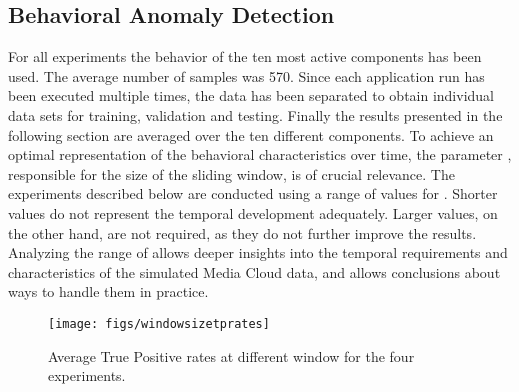 \documentclass{llncs}
\begin{document}
\subsection{Behavioral Anomaly Detection}
\label{evaluationbehavioralanomalydetection}

For all experiments the behavior of the ten most active components has been used. The average number of samples was 570. Since each application run has been executed multiple times, the data has been separated to obtain individual data sets for training, validation and testing. Finally the results presented in the following section are averaged over the ten different components. To achieve an optimal representation of the behavioral characteristics over time, the parameter , responsible for the size of the sliding window, is of crucial relevance. The experiments described below are conducted using a range of values for . Shorter values do not represent the temporal development adequately. Larger values, on the other hand, are not required, as they do not further improve the results. Analyzing the range of  allows deeper insights into the temporal requirements and characteristics of the simulated Media Cloud data, and allows conclusions about ways to handle them in practice.

\begin{figure}[htb]
\vspace{-4mm}
 \centering
 \texttt{[image: figs/windowsizetprates]}
 \caption{Average True Positive rates at different window for the four experiments.}
 \label{fig:windowsizetprates}
\end{figure}
\end{document}
